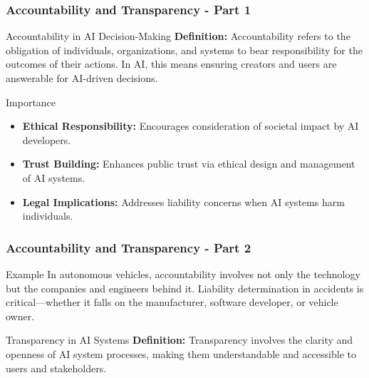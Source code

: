 \documentclass[aspectratio=169]{beamer}
\begin{document}
\begin{frame}[fragile]
    \frametitle{Accountability and Transparency - Part 1}
    \begin{block}{Accountability in AI Decision-Making}
        \textbf{Definition:} Accountability refers to the obligation of individuals, organizations, and systems to bear responsibility for the outcomes of their actions. In AI, this means ensuring creators and users are answerable for AI-driven decisions.
    \end{block}

    \begin{block}{Importance}
        \begin{itemize}
            \item \textbf{Ethical Responsibility:} Encourages consideration of societal impact by AI developers.
            \item \textbf{Trust Building:} Enhances public trust via ethical design and management of AI systems.
            \item \textbf{Legal Implications:} Addresses liability concerns when AI systems harm individuals.
        \end{itemize}
    \end{block}
\end{frame}

\begin{frame}[fragile]
    \frametitle{Accountability and Transparency - Part 2}
    \begin{block}{Example}
        In autonomous vehicles, accountability involves not only the technology but the companies and engineers behind it. Liability determination in accidents is critical—whether it falls on the manufacturer, software developer, or vehicle owner.
    \end{block}
    
    \begin{block}{Transparency in AI Systems}
        \textbf{Definition:} Transparency involves the clarity and openness of AI system processes, making them understandable and accessible to users and stakeholders.
    \end{block}
\end{frame}
\end{document}
